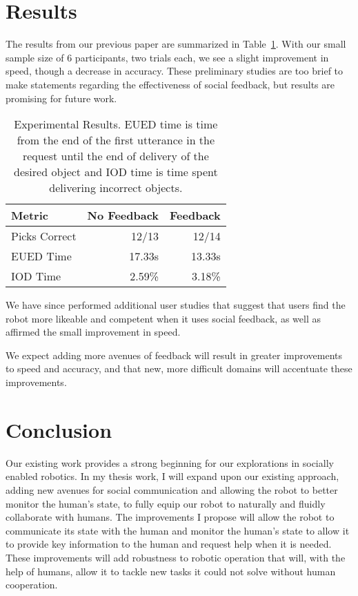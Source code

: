 \documentclass{article}
\begin{document}
\section{Results}

The results from our previous paper are summarized in Table~\ref{table:expResults}. With our small sample size of 6 participants, two trials each, we see a slight improvement in speed, though a decrease in accuracy. These preliminary studies are too brief to make statements regarding the effectiveness of social feedback, but results are promising for future work. 

\begin{table}
\begin{center}
\begin{tabular}{lrr}
\hline
Metric & No Feedback & Feedback \\
\hline
Picks Correct & 12/13 & 12/14\\
EUED Time & 17.33s & 13.33s\\
IOD Time & 2.59\% & 3.18\%\\
\hline
\end{tabular}
\caption{\label{table:expResults} Experimental Results. EUED time is time from
the end of the first utterance in the request until the end of delivery of the
desired object and IOD time is time spent delivering incorrect objects.}
\end{center}
\end{table}

We have since performed additional user studies that suggest that users find the robot more likeable and competent when it uses social feedback, as well as affirmed the small improvement in speed. 

We expect adding more avenues of feedback will result in greater improvements to speed and accuracy, and that new, more difficult domains will accentuate these improvements. 

\section{Conclusion}

Our existing work provides a strong beginning for our explorations in socially enabled robotics. In my thesis work, I will expand upon our existing approach, adding new avenues for social communication and allowing the robot to better monitor the human's state, to fully equip our robot to naturally and fluidly collaborate with humans. The improvements I propose will allow the robot to communicate its state with the human and monitor the human's state to allow it to provide key information to the human and request help when it is needed. These improvements will add robustness to robotic operation that will, with the help of humans, allow it to tackle new tasks it could not solve without human cooperation. 
\end{document}
